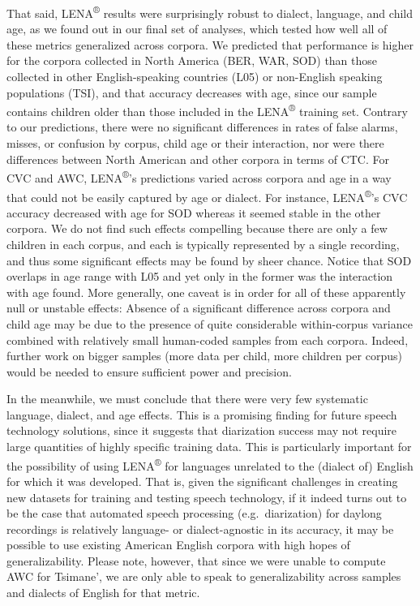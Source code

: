 \documentclass[english,table,man,floatsintext]{apa6}
\begin{document}
That said, LENA\textsuperscript{®} results were surprisingly robust to dialect, language, and child age, as we found out in our final set of analyses, which tested how well all of these metrics generalized across corpora. We predicted that performance is higher for the corpora collected in North America (BER, WAR, SOD) than those collected in other English-speaking countries (L05) or non-English speaking populations (TSI), and that accuracy decreases with age, since our sample contains children older than those included in the LENA\textsuperscript{®} training set. Contrary to our predictions, there were no significant differences in rates of false alarms, misses, or confusion by corpus, child age or their interaction, nor were there differences between North American and other corpora in terms of CTC. For CVC and AWC, LENA\textsuperscript{®}'s predictions varied across corpora and age in a way that could not be easily captured by age or dialect. For instance, LENA\textsuperscript{®}'s CVC accuracy decreased with age for SOD whereas it seemed stable in the other corpora. We do not find such effects compelling because there are only a few children in each corpus, and each is typically represented by a single recording, and thus some significant effects may be found by sheer chance. Notice that SOD overlaps in age range with L05 and yet only in the former was the interaction with age found. More generally, one caveat is in order for all of these apparently null or unstable effects: Absence of a significant difference across corpora and child age may be due to the presence of quite considerable within-corpus variance combined with relatively small human-coded samples from each corpora. Indeed, further work on bigger samples (more data per child, more children per corpus) would be needed to ensure sufficient power and precision.

In the meanwhile, we must conclude that there were very few systematic language, dialect, and age effects. This is a promising finding for future speech technology solutions, since it suggests that diarization success may not require large quantities of highly specific training data. This is particularly important for the possibility of using LENA\textsuperscript{®} for languages unrelated to the (dialect of) English for which it was developed. That is, given the significant challenges in creating new datasets for training and testing speech technology, if it indeed turns out to be the case that automated speech processing (e.g.~diarization) for daylong recordings is relatively language- or dialect-agnostic in its accuracy, it may be possible to use existing American English corpora with high hopes of generalizability. Please note, however, that since we were unable to compute AWC for Tsimane', we are only able to speak to generalizability across samples and dialects of English for that metric.
\end{document}
